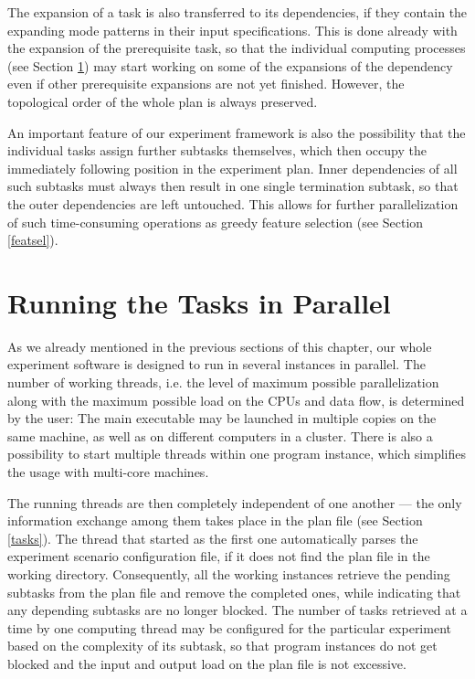 \documentclass[12pt,notitlepage]{report}
\begin{document}
The expansion of a task is also transferred to its dependencies, if they contain the expanding mode patterns in their input specifications. This is done already with the expansion of the prerequisite task, so that the individual computing processes (see Section \ref{parallel}) may start working on some of the expansions of the dependency even if other prerequisite expansions are not yet finished. However, the topological order of the whole plan is always preserved. 
 
An important feature of our experiment framework is also the possibility that the individual tasks assign further subtasks themselves, which then occupy the immediately following position in the experiment plan. Inner dependencies of all such subtasks must always then result in one single termination subtask, so that the outer dependencies are left untouched. This allows for further parallelization of such time-consuming operations as greedy feature selection (see Section \ref{featsel}).

\section{Running the Tasks in Parallel}\label{parallel}

As we already mentioned in the previous sections of this chapter, our whole experiment software is designed to run in several instances in parallel. The number of working threads, i.e. the level of maximum possible parallelization along with the maximum possible load on the CPUs and data flow, is determined by the user: The main executable may be launched in multiple copies on the same machine, as well as on different computers in a cluster. There is also a possibility to start multiple threads within one program instance, which simplifies the usage with multi-core machines.

The running threads are then completely independent of one another --- the only information exchange among them takes place in the plan file (see Section \ref{tasks}). The thread that started as the first one automatically parses the experiment scenario configuration file, if it does not find the plan file in the working directory. Consequently, all the working instances retrieve the pending subtasks from the plan file and remove the completed ones, while indicating that any depending subtasks are no longer blocked. The number of tasks retrieved at a time by one computing thread may be configured for the particular experiment based on the complexity of its subtask, so that program instances do not get blocked and the input and output load on the plan file is not excessive.
\end{document}
